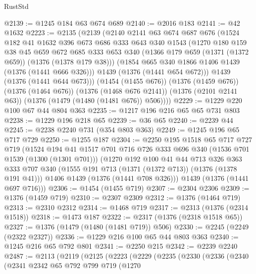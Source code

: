 \begin{lexlean}{RustStd}
\begin{coremodule}
{\begin{coremodule}
{{{{{@2139 := @1245 @184 @63 @674 @689
@2140 := @2016 @183
@2141 := @42 @1632
@2223 := @2135
    (@2139
      (@2140
        @2141
        @63
        @674
        @687
        @676
        (@1524
          @182
          @41
          @1632
          @396
          @673
          @686
          @333
          @643
          @340
          @1543
          (@1270
            @180
            @159
            @38
            @45
            @659
            @672
            @685
            @333
            @653
            @340
            (@1366 @179 @659 (@1371 (@1372 @659)) (@1376 (@1378 @179 @38)))
            (@1854 @665 @340 @1866 @1406 @1439 (@1376 (@1441 @666 @326)))
            @1439
            (@1376 (@1441 @654 @672)))
          @1439
          (@1376 (@1441 @644 @673)))
        (@1454 (@1455 @676))
        (@1376 (@1459 @676))
        (@1376 (@1464 @676))
        (@1376 (@1468 @676 @2141))
        (@1376 (@2101 @2141 @63))
        (@1376 (@1479 (@1480 (@1481 @676)) @506))))
@2229 := @1229 @220 @100 @67 @44 @804 @363
@2235 := @1217 @196 @216 @65 @65 @731 @803
@2238 := @1229 @196 @218 @65
@2239 := @36 @65
@2240 := @2239 @44
@2245 := @2238 @2240 @731 (@354 @803 @363)
@2249 := @1245 @196 @65 @717 @729
@2250 := @1255 @187
@2304 := @2250
    @195
    @1518
    @65
    @717
    @727
    @719
    (@1524
      @194
      @41
      @1517
      @701
      @716
      @726
      @333
      @696
      @340
      (@1536 @701 @1539 (@1300 (@1301 @701)))
      (@1270
        @192
        @100
        @41
        @44
        @713
        @326
        @363
        @333
        @707
        @340
        (@1555 @191 @713 (@1371 (@1372 @713)) (@1376 (@1378 @191 @41)))
        @1406
        @1439
        (@1376 (@1441 @708 @326)))
      @1439
      (@1376 (@1441 @697 @716)))
@2306 := @1454 (@1455 @719)
@2307 := @2304 @2306
@2309 := @1376 (@1459 @719)
@2310 := @2307 @2309
@2312 := @1376 (@1464 @719)
@2313 := @2310 @2312
@2314 := @1468 @719
@2317 := @2313 (@1376 (@2314 @1518))
@2318 := @1473 @187
@2322 := @2317 (@1376 (@2318 @1518 @65))
@2327 := @1376 (@1479 (@1480 (@1481 @719)) @506)
@2330 := @2245 (@2249 (@2322 @2327))
@2336 := @1229 @216 @100 @65 @44 @803 @363
@2340 := @1245 @216 @65 @792 @801
@2341 := @2250 @215
@2342 := @2239 @2240
@2487 := @2113
    (@2119
      (@2125
        (@2223
          (@2229
            (@2235
              (@2330
                (@2336
                  (@2340
                    (@2341
                      @2342
                      @65
                      @792
                      @799
                      @719
                      (@1270
}}}}}
\end{coremodule}}
\end{coremodule}
\end{lexlean}
